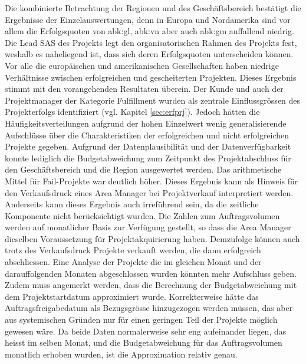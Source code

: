 \newline
Die kombinierte Betrachtung der Regionen und des Geschäftsbereich bestätigt die Ergebnisse der Einzelauswertungen, denn in Europa und Nordamerika sind vor allem die Erfolgsquoten von \gls{abk:gl}, \gls{abk:vn} aber auch \gls{abk:gm} auffallend niedrig.
\newline Die Lead SAS des Projekts legt den organisatorischen Rahmen des Projekts fest, weshalb es naheliegend ist, dass sich deren Erfolgsquoten unterscheiden können. Vor alle die europäischen und amerikanischen Gesellschaften haben niedrige Verhältnisse zwischen erfolgreichen und gescheiterten Projekten. Dieses Ergebnis stimmt mit den vorangehenden Resultaten überein.
\newline
Der Kunde und auch der Projektmanager der Kategorie Fulfillment wurden als zentrale Einflussgrössen des Projekterfolgs identifiziert (vgl. Kapitel \ref{sec:erfprj}). Jedoch hätten die Häufigkeitsverteilungen aufgrund der hohen Einzelwert  wenig generalisierende Aufschlüsse über die Charakteristiken der erfolgreichen und nicht erfolgreichen Projekte gegeben.
\newline\newline
Aufgrund der Datenplausibilität und der Datenverfügbarkeit konnte lediglich die Budgetabweichung zum Zeitpunkt des Projektabschluss für den Geschäftsbereich und die Region ausgewertet werden. Das arithmetische Mittel für Fail-Projekte war deutlich höher. Dieses Ergebnis kann als Hinweis für den Verkaufsdruck eines Area Manager bei Projektverkauf interpretiert werden. Anderseits kann dieses Ergebnis auch irreführend sein, da die zeitliche Komponente nicht berücksichtigt wurden. Die Zahlen zum Auftragsvolumen werden auf monatlicher Basis zur Verfügung gestellt, so dass die Area Manager dieselben Voraussetzung für Projektakquirierung haben. Demzufolge können auch trotz des Verkaufsdruck Projekte verkauft werden, die dann erfolgreich abschliessen. Eine Analyse der Projekte die im gleichen Monat und der darauffolgenden Monaten abgeschlossen wurden könnten mehr Aufschluss geben. Zudem muss angemerkt werden, dass die Berechnung der Budgetabweichung mit dem Projektstartdatum approximiert wurde. Korrekterweise hätte das Auftragsfreigabedatum als Bezugsgrösse hinzugezogen werden müssen, das aber aus systemischen Gründen nur für einen geringen Teil der Projekte möglich gewesen wäre. Da beide Daten normalerweise sehr eng aufeinander liegen, das heisst im selben Monat, und die Budgetabweichung für das Auftragsvolumen monatlich erhoben wurden, ist die Approximation relativ genau.
